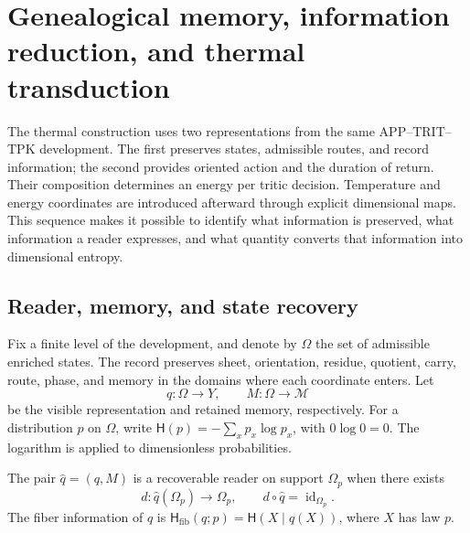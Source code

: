 
\section{Genealogical memory, information reduction, and thermal transduction}
\label{v:ant:sec:ii-kb-aut-desarrollo}

The thermal construction uses two representations from the same
APP--TRIT--TPK development. The first preserves states, admissible routes,
and record information; the second provides oriented action
and the duration of return. Their composition determines an energy per
tritic decision. Temperature and energy coordinates are introduced
afterward through explicit dimensional maps. This sequence
makes it possible to identify what information is preserved, what information a reader
expresses, and what quantity converts that information into dimensional entropy.

\subsection{Reader, memory, and state recovery}

Fix a finite level of the development, and denote by \(\Omega\) the
set of admissible enriched states. The record preserves sheet,
orientation, residue, quotient, carry, route, phase, and memory in the
domains where each coordinate enters. Let
\[
 q:\Omega\longrightarrow Y,\qquad
 M:\Omega\longrightarrow\mathcal M
\]
be the visible representation and retained memory, respectively. For a
distribution \(p\) on \(\Omega\), write
\(\mathsf H(p)=-\sum_xp_x\log p_x\), with \(0\log0=0\).
The logarithm is applied to dimensionless probabilities.

\begin{definition}
The pair \(\widehat q=(q,M)\) is a recoverable reader on support
\(\Omega_p\) when there exists
\[
 d:\widehat q(\Omega_p)\longrightarrow\Omega_p,
 \qquad d\circ\widehat q=\operatorname{id}_{\Omega_p}.
\]
The fiber information of \(q\) is
\(\mathsf H_{\mathrm{fib}}(q;p)=\mathsf H(X\mid q(X))\), where
\(X\) has law \(p\).
\end{definition}

